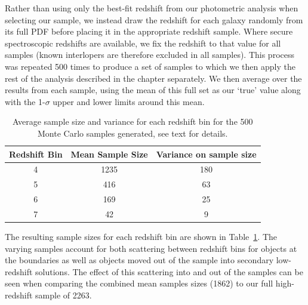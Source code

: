 Rather than using only the best-fit redshift from our photometric analysis when selecting our sample, we instead draw the redshift for each galaxy randomly from its full PDF before placing it in the appropriate redshift sample. Where secure spectroscopic redshifts are available, we fix the redshift to that value for all samples (known interlopers are therefore excluded in all samples). This process was repeated 500 times to produce a set of samples to which we then apply the rest of the analysis described in the chapter separately. We then average over the results from each sample, using the mean of this full set as our `true' value along with the 1-$\sigma$ upper and lower limits around this mean. 

\begin{table}
\centering
\caption[Average sample size and variance for each redshift bin for the 500 Monte Carlo samples.]{Average sample size and variance for each redshift bin for the 500 Monte Carlo samples generated, see text for details.}
\label{tab:samplesizes}
\begin{tabular}{@{}ccc}
\hline
 Redshift Bin & Mean Sample Size & Variance on sample size  \\
  \hline
 4 & 1235 & 180 \\
 5 & 416 & 63 \\
 6 & 169 & 25 \\
 7 & 42 & 9 \\
 \hline
\end{tabular}
\end{table}

The resulting sample sizes for each redshift bin are shown in Table~\ref{tab:samplesizes}. The varying samples account for both scattering between redshift bins for objects at the boundaries as well as objects moved out of the sample into secondary low-redshift solutions. The effect of this scattering into and out of the samples can be seen when comparing the combined mean samples sizes (1862) to our full high-redshift sample of 2263.

